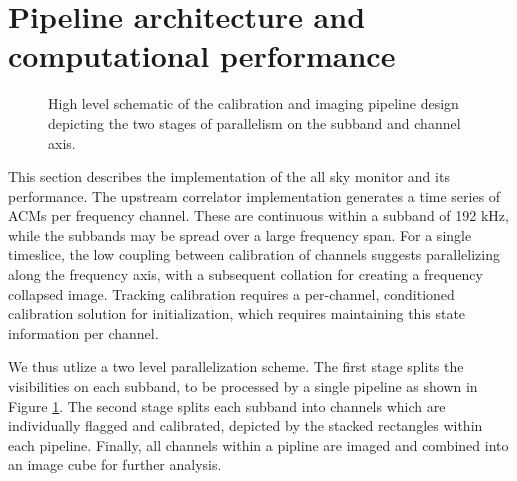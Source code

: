 \documentclass{aa}
\begin{document}
\section{\label{sec:Computational-performance}Pipeline architecture and computational performance}
\begin{figure}[tbh]
\caption{\label{fig:pipeline}  High  level  schematic  of  the  calibration  and
  imaging pipeline design depicting the two stages of parallelism on the subband
  and channel axis.}
\end{figure}

This  section  describes the  implementation  of the  all  sky  monitor and  its
performance. The  upstream correlator implementation generates a  time series of
ACMs per  frequency channel. These are  continuous within a subband  of 192 kHz,
while  the subbands may  be spread  over a  large frequency  span. For  a single
timeslice,   the  low   coupling  between   calibration  of   channels  suggests
parallelizing along the frequency axis, with a subsequent collation for creating
a  frequency  collapsed image.   Tracking  calibration  requires a  per-channel,
conditioned calibration solution  for initialization, which requires maintaining
this state information per channel. 

We thus  utlize a two level  parallelization scheme. The first  stage splits the
visibilities on each  subband, to be processed by a single  pipeline as shown in
Figure \ref{fig:pipeline}.   The second stage splits each  subband into channels
which  are  individually  flagged   and  calibrated,  depicted  by  the  stacked
rectangles within  each pipeline.   Finally, all channels  within a  pipline are
imaged and combined into an image cube for further analysis.
\end{document}
